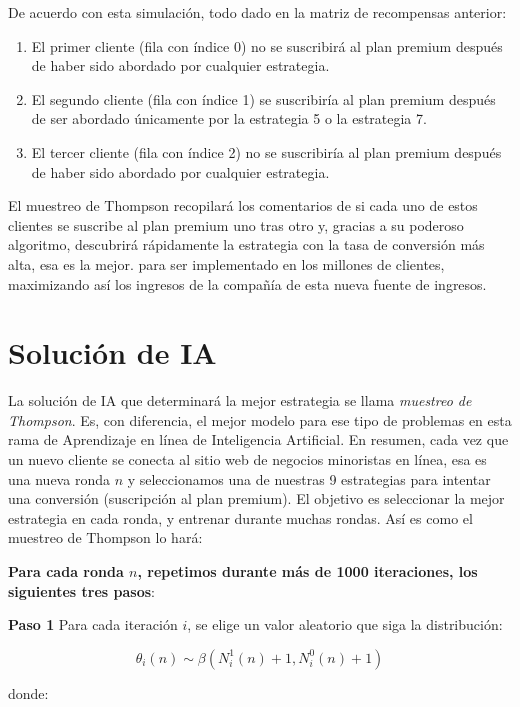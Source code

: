 \documentclass[]{book}
\providecommand{\tightlist}{%
  \setlength{\itemsep}{0pt}\setlength{\parskip}{0pt}}
\begin{document}
De acuerdo con esta simulación, todo dado en la matriz de recompensas anterior:

\begin{enumerate}
\def\labelenumi{\arabic{enumi}.}
\tightlist
\item
  El primer cliente (fila con índice 0) no se suscribirá al plan premium después de haber sido abordado por cualquier estrategia.
\item
  El segundo cliente (fila con índice 1) se suscribiría al plan premium después de ser abordado únicamente por la estrategia 5 o la estrategia 7.
\item
  El tercer cliente (fila con índice 2) no se suscribiría al plan premium después de haber sido abordado por cualquier estrategia.
\end{enumerate}

El muestreo de Thompson recopilará los comentarios de si cada uno de estos clientes se suscribe al plan premium uno tras otro y, gracias a su poderoso algoritmo, descubrirá rápidamente la estrategia con la tasa de conversión más alta, esa es la mejor. para ser implementado en los millones de clientes, maximizando así los ingresos de la compañía de esta nueva fuente de ingresos.

\hypertarget{soluciuxf3n-de-ia-1}{%
\section{Solución de IA}\label{soluciuxf3n-de-ia-1}}

La solución de IA que determinará la mejor estrategia se llama \emph{muestreo de Thompson}. Es, con diferencia, el mejor modelo para ese tipo de problemas en esta rama de Aprendizaje en línea de Inteligencia Artificial. En resumen, cada vez que un nuevo cliente se conecta al sitio web de negocios minoristas en línea, esa es una nueva ronda \(n\) y seleccionamos una de nuestras 9 estrategias para intentar una conversión (suscripción al plan premium). El objetivo es seleccionar la mejor estrategia en cada ronda, y entrenar durante muchas rondas. Así es como el muestreo de Thompson lo hará:

\textbf{Para cada ronda \(n\), repetimos durante más de 1000 iteraciones, los siguientes tres pasos}:

\textbf{Paso 1} Para cada iteración \(i\), se elige un valor aleatorio que siga la distribución:

\[\theta_i(n) \sim \beta(N_i^1(n)+1,N_i^0(n)+1)\]

donde:
\end{document}
